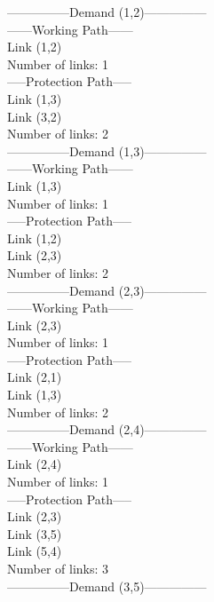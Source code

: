 ---------------Demand (1,2)--------------- \\

------Working Path------ \\
Link  (1,2) \\
Number of links: 1 \\

-----Protection Path----- \\
Link  (1,3) \\
Link  (3,2) \\
Number of links: 2 \\


---------------Demand (1,3)--------------- \\

------Working Path------ \\
Link  (1,3) \\
Number of links: 1 \\

-----Protection Path----- \\
Link  (1,2) \\
Link  (2,3) \\
Number of links: 2 \\


---------------Demand (2,3)--------------- \\

------Working Path------ \\
Link  (2,3) \\
Number of links: 1 \\

-----Protection Path----- \\
Link  (2,1) \\
Link  (1,3) \\
Number of links: 2 \\


---------------Demand (2,4)--------------- \\

------Working Path------ \\
Link  (2,4) \\
Number of links: 1 \\

-----Protection Path----- \\
Link  (2,3) \\
Link  (3,5) \\
Link  (5,4) \\
Number of links: 3 \\


---------------Demand (3,5)--------------- \\

